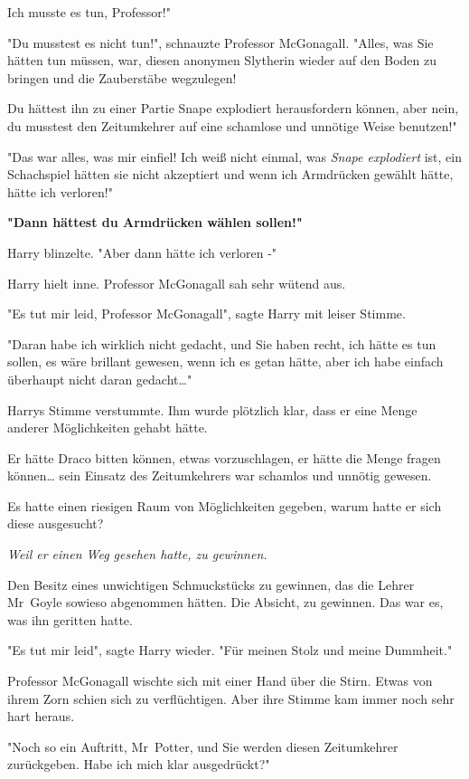 {Ich musste es tun, Professor!"

"Du musstest es nicht tun!", schnauzte Professor McGonagall. "Alles, was Sie hätten tun müssen, war, diesen anonymen Slytherin wieder auf den Boden zu bringen und die Zauberstäbe wegzulegen!

Du hättest ihn zu einer Partie Snape explodiert herausfordern können, aber nein, du musstest den Zeitumkehrer auf eine schamlose und unnötige Weise benutzen!"

"Das war alles, was mir einfiel! Ich weiß nicht einmal, was \emph{Snape explodiert} ist, ein Schachspiel hätten sie nicht akzeptiert und wenn ich Armdrücken gewählt hätte, hätte ich verloren!"

\textbf{"Dann hättest du Armdrücken wählen sollen!"}

Harry blinzelte. "Aber dann hätte ich verloren -"

Harry hielt inne. Professor McGonagall sah sehr wütend aus.

"Es tut mir leid, Professor McGonagall", sagte Harry mit leiser Stimme.

"Daran habe ich wirklich nicht gedacht, und Sie haben recht, ich hätte es tun sollen, es wäre brillant gewesen, wenn ich es getan hätte, aber ich habe einfach überhaupt nicht daran gedacht…"

Harrys Stimme verstummte. Ihm wurde plötzlich klar, dass er eine Menge anderer Möglichkeiten gehabt hätte.

Er hätte Draco bitten können, etwas vorzuschlagen, er hätte die Menge fragen können… sein Einsatz des Zeitumkehrers war schamlos und unnötig gewesen.

Es hatte einen riesigen Raum von Möglichkeiten gegeben, warum hatte er sich diese ausgesucht?

\emph{Weil er einen Weg gesehen hatte, zu gewinnen.}

Den Besitz eines unwichtigen Schmuckstücks zu gewinnen, das die Lehrer Mr~Goyle sowieso abgenommen hätten. Die Absicht, zu gewinnen. Das war es, was ihn geritten hatte.

"Es tut mir leid", sagte Harry wieder. "Für meinen Stolz und meine Dummheit."

Professor McGonagall wischte sich mit einer Hand über die Stirn. Etwas von ihrem Zorn schien sich zu verflüchtigen. Aber ihre Stimme kam immer noch sehr hart heraus.

"Noch so ein Auftritt, Mr~Potter, und Sie werden diesen Zeitumkehrer zurückgeben. Habe ich mich klar ausgedrückt?"

}
